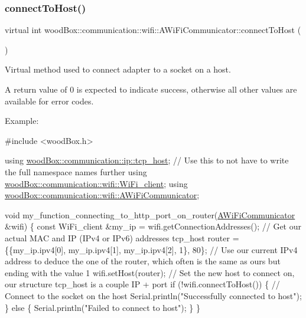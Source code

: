 \subsubsection{\texorpdfstring{connect\+To\+Host()}{connectToHost()}}
{\footnotesize\ttfamily virtual int wood\+Box\+::communication\+::wifi\+::\+A\+Wi\+Fi\+Communicator\+::connect\+To\+Host (\begin{DoxyParamCaption}{ }\end{DoxyParamCaption})\hspace{0.3cm}{\ttfamily [pure virtual]}}

Virtual method used to connect adapter to a socket on a host.

A return value of 0 is expected to indicate success, otherwise all other values are available for error codes.

Example\+:


\begin{DoxyCode}
\textcolor{preprocessor}{#include <woodBox.h>}

\textcolor{keyword}{using} \mbox{\hyperlink{structwood_box_1_1communication_1_1ip_1_1s__host}{woodBox::communication::ip::tcp\_host}}; \textcolor{comment}{// Use this to not have to
       write the full namespace names further}
\textcolor{keyword}{using} \mbox{\hyperlink{structwood_box_1_1communication_1_1wifi_1_1s__wifi__client}{woodBox::communication::wifi::WiFi\_client}};
\textcolor{keyword}{using} \mbox{\hyperlink{classwood_box_1_1communication_1_1wifi_1_1_a_wi_fi_communicator}{woodBox::communication::wifi::AWiFiCommunicator}};

\textcolor{keywordtype}{void} my\_function\_connecting\_to\_http\_port\_on\_router(\mbox{\hyperlink{classwood_box_1_1communication_1_1wifi_1_1_a_wi_fi_communicator_a9d1dc13ca9243170b04211bef2b86ed2}{AWiFiCommunicator}} &wifi) \{
  \textcolor{keyword}{const} WiFi\_client &my\_ip = wifi.getConnectionAddresses(); \textcolor{comment}{// Get our actual MAC and IP (IPv4 or IPv6)
       addresses}
  tcp\_host router = \{\{my\_ip.ipv4[0], my\_ip.ipv4[1], my\_ip.ipv4[2], 1\}, 80\}; \textcolor{comment}{// Use our current IPv4 address
       to deduce the one of the router, which often is the same as ours but ending with the value 1}
  wifi.setHost(router); \textcolor{comment}{// Set the new host to connect on, our structure tcp\_host is a couple IP + port}
  \textcolor{keywordflow}{if} (!wifi.connectToHost()) \{ \textcolor{comment}{// Connect to the socket on the host}
    Serial.println(\textcolor{stringliteral}{"Successfully connected to host"});
  \} \textcolor{keywordflow}{else} \{
    Serial.println(\textcolor{stringliteral}{"Failed to connect to host"});
  \}
\}
\end{DoxyCode}
 

